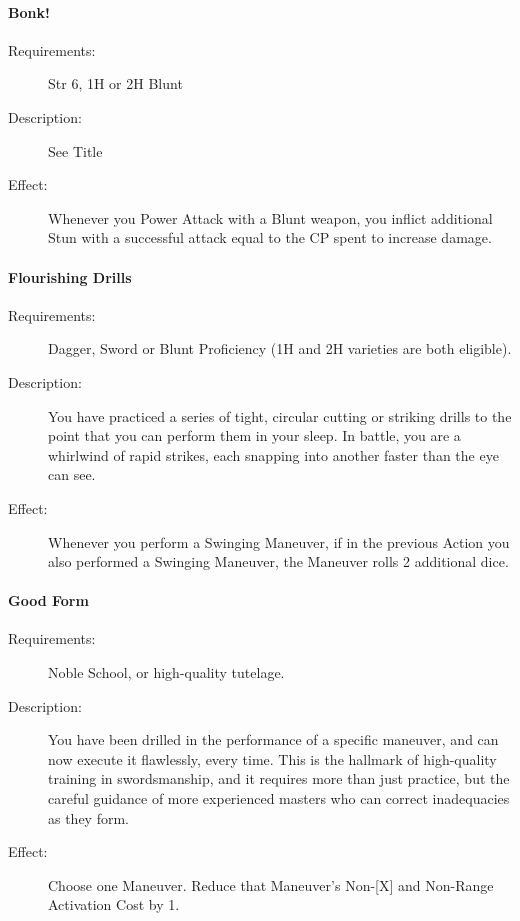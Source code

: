\documentclass[oneside,11pt,english]{book}
\begin{document}
\paragraph{Bonk!}\label{talent:Bonk!}
\begin{description}
	\item [Requirements:] Str 6, 1H or 2H Blunt 
	\item [Description:] See Title 
	\item [Effect:] Whenever you Power Attack with a Blunt weapon, you inflict additional Stun with a successful attack equal to the CP spent to increase damage. 
\end{description}

\paragraph{Flourishing Drills}\label{talent:Flourishing Drills}
\begin{description}
	\item [Requirements:] Dagger, Sword or Blunt Proficiency (1H and 2H varieties are both eligible). 
	\item [Description:] You have practiced a series of tight, circular cutting or striking drills to the point that you can perform them in your sleep. In battle, you are a whirlwind of rapid strikes, each snapping into another faster than the eye can see. 
	\item [Effect:] Whenever you perform a Swinging Maneuver, if in the previous Action you also performed a Swinging Maneuver, the Maneuver rolls 2 additional dice. 
\end{description}

\paragraph{\label{talent:Good Form}Good Form}
\begin{description}
	\item [Requirements:] Noble School, or high-quality tutelage. 
	\item [Description:] You have been drilled in the performance of a specific maneuver, and can now execute it 
	flawlessly, every time. This is the hallmark of high-quality training in swordsmanship, and it requires 
	more than just practice, but the careful guidance of more experienced masters who can correct 
	inadequacies as they form. 
	\item [Effect:] Choose one Maneuver. Reduce that Maneuver’s Non-[X] and Non-Range Activation Cost by 1. 
	
\end{description}
\end{document}

